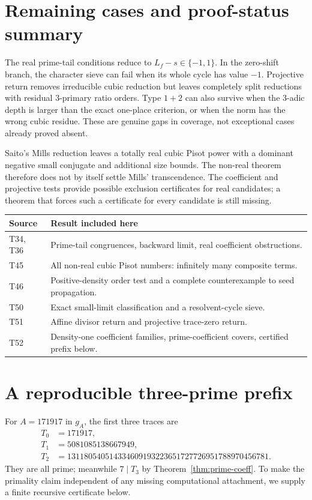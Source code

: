 \documentclass[11pt,a4paper]{article}
\theoremstyle{definition}\newtheorem{definition}[theorem]{Definition}
\theoremstyle{remark}\newtheorem{remark}[theorem]{Remark}
\begin{document}
\section{Remaining cases and proof-status summary}
The real prime-tail conditions reduce to $L_f-s\in\{-1,1\}$. In the zero-shift branch, the character sieve can fail when its whole cycle has value $-1$. Projective return removes irreducible cubic reduction but leaves completely split reductions with residual $3$-primary ratio orders. Type $1+2$ can also survive when the $3$-adic depth is larger than the exact one-place criterion, or when the norm has the wrong cubic residue. These are genuine gaps in coverage, not exceptional cases already proved absent.

Saito's Mills reduction \cite{saito-variants} leaves a totally real cubic Pisot power with a dominant negative small conjugate and additional size bounds. The non-real theorem therefore does not by itself settle Mills' transcendence. The coefficient and projective tests provide possible exclusion certificates for real candidates; a theorem that forces such a certificate for every candidate is still missing.

\begin{center}
\begin{tabular}{p{.20\linewidth}p{.69\linewidth}}
\toprule
Source & Result included here\\\midrule
T34, T36 & Prime-tail congruences, backward limit, real coefficient obstructions.\\
T45 & All non-real cubic Pisot numbers: infinitely many composite terms.\\
T46 & Positive-density order test and a complete counterexample to seed propagation.\\
T50 & Exact small-limit classification and a resolvent-cycle sieve.\\
T51 & Affine divisor return and projective trace-zero return.\\
T52 & Density-one coefficient families, prime-coefficient covers, certified prefix below.\\\bottomrule
\end{tabular}
\end{center}

\appendix
\section{A reproducible three-prime prefix}
For $A=171917$ in $g_A$, the first three traces are
\begin{align*}
 T_0&=171917,\\
 T_1&=5081085138667949,\\
 T_2&=131180540514334609193223651727726951788970456781.
\end{align*}
They are all prime; meanwhile $7\mid T_3$ by Theorem~\ref{thm:prime-coeff}. To make the primality claim independent of any missing computational attachment, we supply a finite recursive certificate below.
\end{document}
